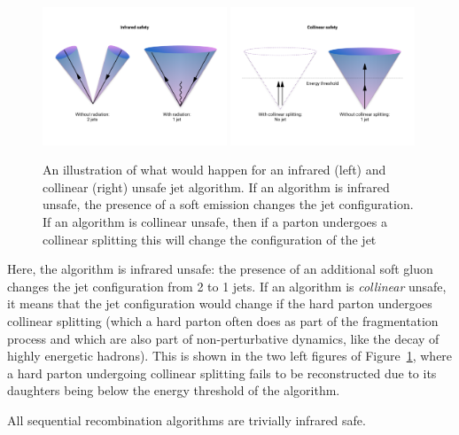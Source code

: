 \begin{figure}[h!] 
    \centering
    \includegraphics[width=0.49\textwidth]{figures/event_reconstruction/IR_safety.pdf}
    \includegraphics[width=0.49\textwidth]{figures/event_reconstruction/Collinear_safety.pdf}
    \caption{An illustration of what would happen for an infrared (left) and collinear (right) unsafe jet algorithm. If an algorithm is infrared unsafe, the presence of a soft emission changes the jet configuration. If an algorithm is collinear unsafe, then if a parton undergoes a collinear splitting this will change the configuration of the jet}
    \label{fig:objreco:IRC}
\end{figure}

Here, the algorithm is infrared unsafe: the presence of an additional soft gluon changes the jet configuration from 2 to 1 jets. If an algorithm is \textit{collinear} unsafe, it means that the jet configuration would change if the hard parton undergoes collinear splitting (which a hard parton often does as part of the fragmentation process and which are also part of non-perturbative dynamics, like the decay of highly energetic hadrons). This is shown in the two left figures of Figure~\ref{fig:objreco:IRC}, where a hard parton undergoing collinear splitting fails to be reconstructed due to its daughters being below the energy threshold of the algorithm.


All sequential recombination algorithms are trivially infrared safe.
 
